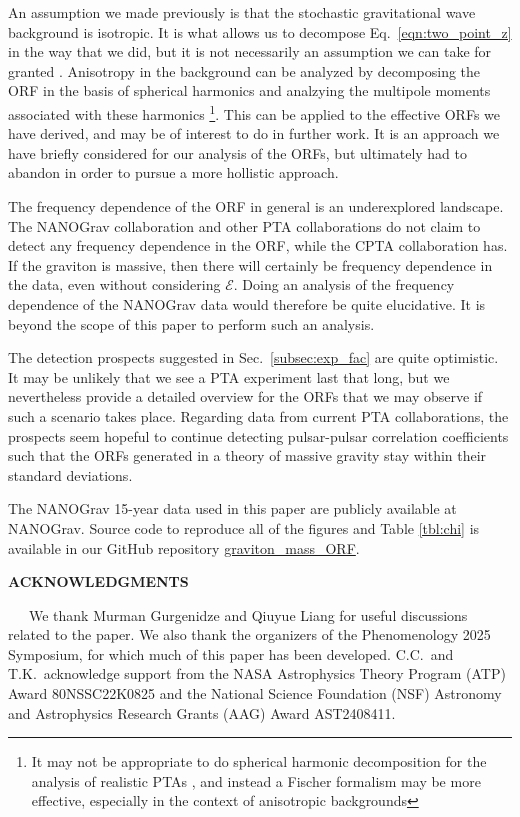 \documentclass[prd,aps,psfig,nofootinbib,nobibnotes,superscriptaddress,preprintnumbers,times]{revtex4-2}\setlength{\topmargin}{-14mm}
\begin{document}
An assumption we made previously is that the stochastic gravitational wave background is isotropic. It is what allows us to decompose Eq.\ \ref{eqn:two_point_z} in the way that we did, but it is not necessarily an assumption we can take for granted \cite{Depta:2024ykq, Bravo:2025csu, Cusin:2025xle, Kuwahara:2024jiz, Li:2024lvt}. Anisotropy in the background can be analyzed by decomposing the ORF in the basis of spherical harmonics and analzying the multipole moments associated with these harmonics \cite{Allen:2024bnk, Gair:2014rwa}\footnote{It may not be appropriate to do spherical harmonic decomposition for the analysis of realistic PTAs \cite{Ali-Haimoud:2020ozu}, and instead a Fischer formalism may be more effective, especially in the context of anisotropic backgrounds}. This can be applied to the effective ORFs we have derived, and may be of interest to do in further work. It is an approach we have briefly considered for our analysis of the ORFs, but ultimately had to abandon in order to pursue a more hollistic approach.

The frequency dependence of the ORF in general is an underexplored landscape. The NANOGrav collaboration and other PTA collaborations do not claim to detect any frequency dependence in the ORF, while the CPTA collaboration has. If the graviton is massive, then there will certainly be frequency dependence in the data, even without considering $\mathcal{E}$. Doing an analysis of the frequency dependence of the NANOGrav data would therefore be quite elucidative. It is beyond the scope of this paper to perform such an analysis.

The detection prospects suggested in Sec.\ \ref{subsec:exp_fac} are quite optimistic. It may be unlikely that we see a PTA experiment last that long, but we nevertheless provide a detailed overview for the ORFs that we may observe if such a scenario takes place. Regarding data from current PTA collaborations, the prospects seem hopeful to continue detecting pulsar-pulsar correlation coefficients such that the ORFs generated in a theory of massive gravity stay within their standard deviations. 

\vspace{3mm}
The NANOGrav 15-year data used in this paper are publicly available at NANOGrav. Source code to reproduce all of the figures and Table \ref{tbl:chi} is available in our GitHub repository \href{https://github.com/ChrisChoi314/graviton_mass_ORF}{graviton\_mass\_ORF}.

\begin{center}
    \textbf{ACKNOWLEDGMENTS}    
\end{center}
\ \ \ We thank Murman Gurgenidze and Qiuyue Liang for useful discussions related to the paper. We also thank the organizers of the Phenomenology 2025 Symposium, for which much of this paper has been developed. C.C.\ and T.K.\ acknowledge support from the NASA Astrophysics Theory Program (ATP) Award 80NSSC22K0825 and the National Science Foundation (NSF) Astronomy and Astrophysics Research Grants (AAG) Award AST2408411.




\clearpage
\end{document}
